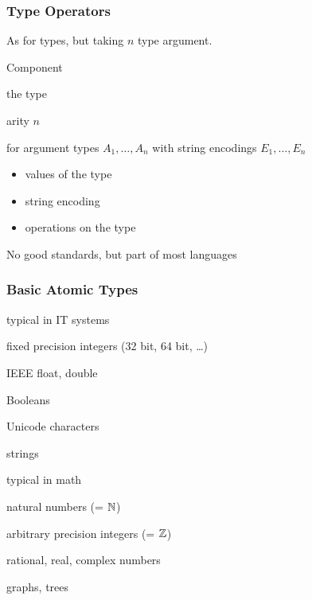 \begin{frame}\frametitle{Type Operators}
As for types, but taking $n$ type argument.

\begin{blockitems}{Component}
 \item the type 
 \item arity $n$ 
 \item for argument types $A_1,\ldots,A_n$ with string encodings $E_1,\ldots,E_n$
  \begin{itemize}
  \item values of the type 
  \item string encoding 
  \item operations on the type 
  \end{itemize}
\end{blockitems}

No good standards, but part of most languages
\end{frame}

\begin{frame}\frametitle{Basic Atomic Types}
\begin{blockitems}{typical in IT systems}
 \item fixed precision integers (32 bit, 64 bit, \ldots)
 \item IEEE float, double
 \item Booleans
 \item Unicode characters
 \item strings 
\end{blockitems}

\begin{blockitems}{typical in math}
 \item natural numbers (= $\mathbb{N}$)
 \item arbitrary precision integers (= $\mathbb{Z}$)
 \item rational, real, complex numbers
 \item graphs, trees
\end{blockitems}
\end{frame}

